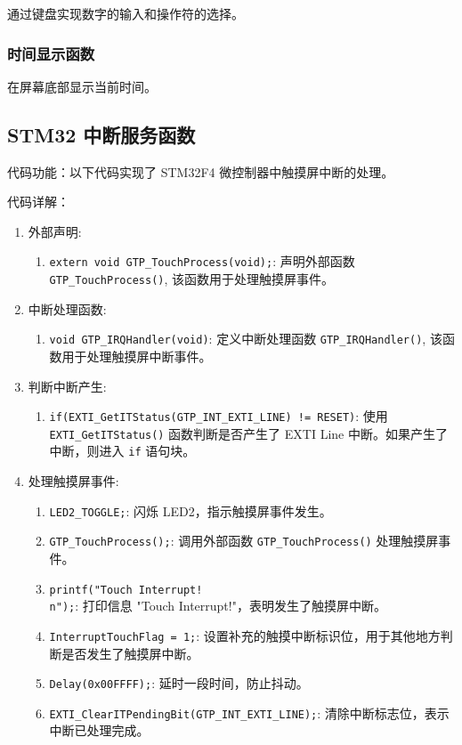 \documentclass{theme-2639013-final}
\begin{document}
通过键盘实现数字的输入和操作符的选择。

\subsubsection{时间显示函数}

在屏幕底部显示当前时间。

\subsection{STM32 中断服务函数}

代码功能：以下代码实现了 STM32F4 微控制器中触摸屏中断的处理。

代码详解：

\begin{enumerate}
  \item 外部声明:
    \begin{enumerate}
      \item \texttt{extern void GTP\_TouchProcess(void);}: 声明外部函数 \texttt{GTP\_TouchProcess()}, 该函数用于处理触摸屏事件。
    \end{enumerate}

  \item 中断处理函数:
    \begin{enumerate}
      \item \texttt{void GTP\_IRQHandler(void)}: 定义中断处理函数 \texttt{GTP\_IRQHandler()}, 该函数用于处理触摸屏中断事件。
    \end{enumerate}

  \item 判断中断产生:
    \begin{enumerate}
      \item \texttt{if(EXTI\_GetITStatus(GTP\_INT\_EXTI\_LINE) != RESET)}: 使用 \texttt{EXTI\_GetITStatus()} 函数判断是否产生了 EXTI Line 中断。如果产生了中断，则进入 \texttt{if} 语句块。
    \end{enumerate}

  \item 处理触摸屏事件:
    \begin{enumerate}
      \item \texttt{LED2\_TOGGLE;}: 闪烁 LED2，指示触摸屏事件发生。
      \item \texttt{GTP\_TouchProcess();}: 调用外部函数 \texttt{GTP\_TouchProcess()} 处理触摸屏事件。
      \item \texttt{printf("Touch Interrupt!\\n");}: 打印信息 "Touch Interrupt!"，表明发生了触摸屏中断。
      \item \texttt{InterruptTouchFlag = 1;}: 设置补充的触摸中断标识位，用于其他地方判断是否发生了触摸屏中断。
      \item \texttt{Delay(0x00FFFF);}: 延时一段时间，防止抖动。
      \item \texttt{EXTI\_ClearITPendingBit(GTP\_INT\_EXTI\_LINE);}: 清除中断标志位，表示中断已处理完成。
    \end{enumerate}


\end{enumerate}
\end{document}
